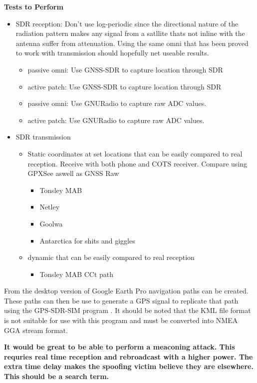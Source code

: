 \textbf{Tests to Perform}
\begin{itemize}
    \item SDR reception: Don't use log-periodic since the directional nature of the radiation pattern makes any signal from a satllite thats not inline with the antenna
    suffer from attenuation. Using the same omni that has been proved to work with transmission should hopefully net useable results. 
    \begin{itemize}
        \item passive omni: Use GNSS-SDR to capture location through SDR
        \item active patch: Use GNSS-SDR to capture location through SDR
        \item passive omni: Use GNURadio to capture raw ADC values.
        \item active patch: Use GNURadio to capture raw ADC values.
    \end{itemize}
    \item SDR transmission
    \begin{itemize}
        \item Static coordinates at set locations that can be easily compared to real reception. Receive with both phone and COTS receiver. Compare using GPXSee aswell as
        GNSS Raw
        \begin{itemize}
            \item Tonsley MAB
            \item Netley
            \item Goolwa
            \item Antarctica for shits and giggles
        \end{itemize}
        \item dynamic that can be easily compared to real reception
        \begin{itemize}
            \item Tonsley MAB CCt path
        \end{itemize}
    \end{itemize}
\end{itemize}

From the desktop version of Google Earth Pro navigation paths can be created. These paths can then be use to generate a GPS signal to replicate that path using the
GPS-SDR-SIM program \cite{RN42}. It should be noted that the KML file format is not suitable for use with this program and must be converted into NMEA GGA stream format.

\textbf{It would be great to be able to perform a meaconing attack. This requries real time reception and rebroadcast with a higher power. The extra time delay
makes the spoofing victim believe they are elsewhere. This should be a search term.}

